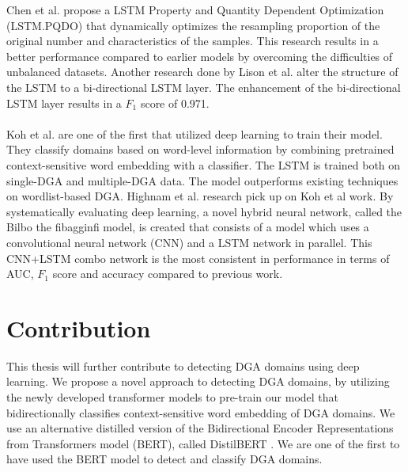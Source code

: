 Chen et al. \cite{Chen} propose a LSTM Property and Quantity Dependent Optimization (LSTM.PQDO) that dynamically optimizes the resampling proportion of the original number and characteristics of the samples. This research results in a better performance compared to earlier models by overcoming the difficulties of unbalanced datasets. Another research done by Lison et al. \cite{Lison} alter the structure of the LSTM to a bi-directional LSTM layer. The enhancement of the bi-directional LSTM layer results in a $F_1$ score of 0.971.\\\\
Koh et al. \cite{Koh} are one of the first that utilized deep learning to train their model. They classify domains based on word-level information by combining pretrained context-sensitive word embedding with a classifier. The LSTM is trained both on single-DGA and multiple-DGA data. The model outperforms existing techniques on wordlist-based DGA.  
Highnam et al. \cite{Highnam} research pick up on Koh et al \cite{Koh} work. By systematically evaluating deep learning, a novel hybrid neural network, called the Bilbo the fibagginfi model, is created that consists of a model which uses a convolutional neural network (CNN) and a LSTM network in parallel. 
This CNN+LSTM combo network is the most consistent in performance in terms of AUC, $F_1$ score and accuracy compared to previous work. 
\section{Contribution}
This thesis will further contribute to detecting DGA domains using deep learning. We propose a novel approach to detecting DGA domains, by utilizing the newly developed transformer models to pre-train our model that bidirectionally classifies context-sensitive word embedding of DGA domains. We use an alternative distilled version of the Bidirectional Encoder Representations from Transformers model (BERT), called DistilBERT \cite{Sanh2019DistilBERTAD}. We are one of the first to have used the BERT model to detect and classify DGA domains.